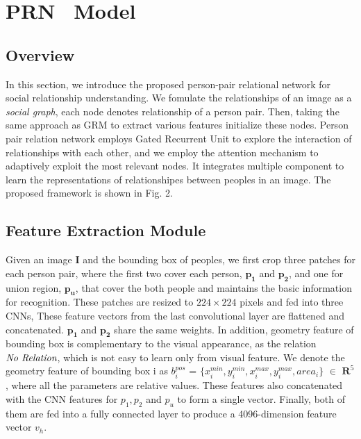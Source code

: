 \documentclass{article}
\begin{document}
\section{PRN \ Model}

\subsection{Overview} \label{section:ov}
In this section, we introduce the proposed person-pair relational network for social relationship understanding. We fomulate the relationships of an image as a \emph{social graph}, each node denotes relationship of a person pair. Then, taking the same approach as GRM\cite{DBLP:conf/ijcai/WangCRYCL18} to extract various features initialize these nodes. Person pair relation  network employs Gated Recurrent Unit\cite{DBLP:conf/ssst/ChoMBB14} to explore the interaction of relationships with each other, and we employ the attention mechanism to adaptively exploit the most relevant nodes. It integrates multiple
component to learn the representations of relationshipes between peoples in an image. 
 The proposed framework is shown in Fig. 2.

\subsection{Feature Extraction Module} \label{section:vs}

Given an image \textbf{I} and the bounding box of peoples, we first crop three patches for each person pair, where the first two cover each person, $\mathbf{p_1}$ and $\mathbf{p_2}$, and one for union region, $\mathbf{p_u}$, that cover the both people and maintains the basic information for recognition. These patches are resized to $224\times224$ pixels and fed into three CNNs, These feature vectors from the last convolutional layer are flattened and concatenated. $\mathbf{p_1}$ and $\mathbf{p_2}$ share the same weights.
In addition, geometry feature of bounding box is complementary to the visual appearance, as the relation $\emph{No Relation}$, which is not easy to learn only from visual feature. We denote the geometry feature of bounding box i as $b_i^{pos}$ = $\{x_i^{min}, y_i^{min},x_i^{max},y_i^{max},area_i\}$  $\in$ $\mathbf{R}^5$, where all the parameters are relative values. These features also concatenated with the CNN features for $p_1,p_2$ and $p_u$ to form a single vector. Finally, both of them are fed into a fully connected layer to produce a 4096-dimension feature vector $v_h$. 
\end{document}
